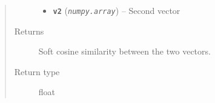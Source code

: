 \documentclass[letterpaper,10pt,english]{sphinxmanual}
\begin{document}
\begin{fulllineitems}
\begin{fulllineitems}
\begin{quote}
\begin{description}
\begin{itemize}
\item {} 
\textbf{\texttt{v2}} (\emph{\texttt{numpy.array}}) -- Second vector

\end{itemize}

\item[{Returns}] \leavevmode
Soft cosine similarity between the two vectors.

\item[{Return type}] \leavevmode
float

\end{description}\end{quote}

\end{fulllineitems}


\end{fulllineitems}

\end{document}
